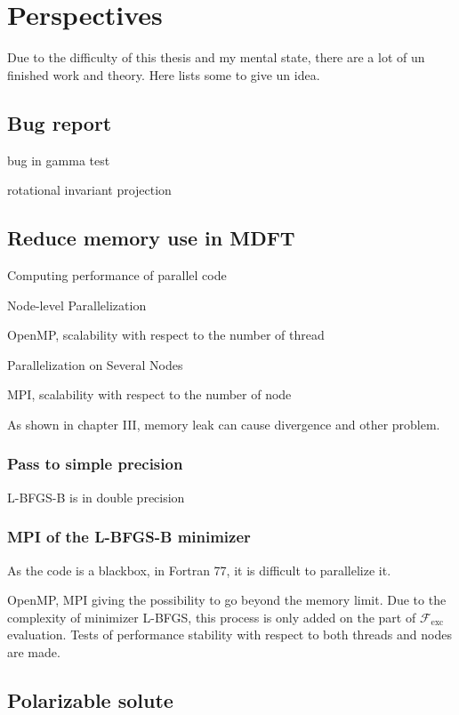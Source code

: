 
\chapter{Perspectives\label{chpt:perspectives}}

Due to the difficulty of this thesis and my mental state, there are
a lot of un finished work and theory. Here lists some to give un idea.

\section{Bug report}

bug in gamma test

rotational invariant projection

\section{Reduce memory use in MDFT}

Computing performance of parallel code

Node-level Parallelization

OpenMP, scalability with respect to the number of thread

Parallelization on Several Nodes

MPI, scalability with respect to the number of node

As shown in chapter III, memory leak can cause divergence and other
problem.

\subsection{Pass to simple precision}

L-BFGS-B is in double precision

\subsection{MPI of the L-BFGS-B minimizer}

As the code is a blackbox, in Fortran 77, it is difficult to parallelize
it. 

OpenMP, MPI giving the possibility to go beyond the memory limit.
Due to the complexity of minimizer L-BFGS, this process is only added
on the part of $\mathcal{F}_{\mathrm{exc}}$ evaluation. Tests of
performance stability with respect to both threads and nodes are made.

\section{Polarizable solute}

